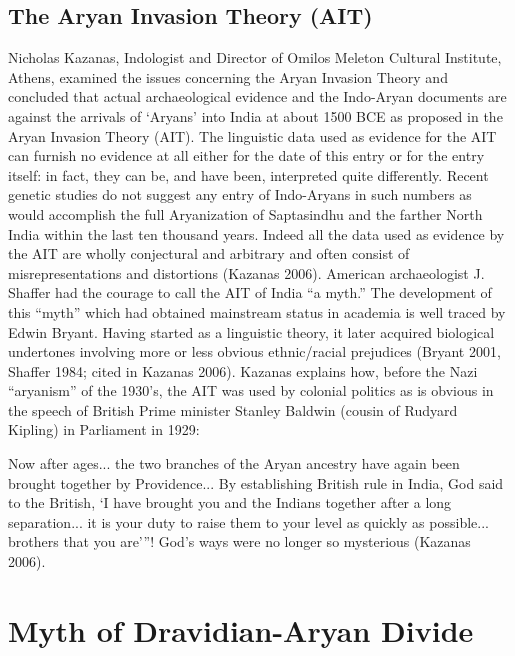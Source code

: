 \subsection*{The Aryan Invasion Theory (AIT)}

Nicholas Kazanas, Indologist and Director of Omilos Meleton Cultural Institute, Athens, examined the issues concerning the Aryan Invasion Theory and concluded that actual archaeological evidence and the Indo-Aryan documents are against the arrivals of ‘Aryans’ into India at about 1500 BCE as proposed in the Aryan Invasion Theory (AIT). The linguistic data used as evidence for the AIT can furnish no evidence at all either for the date of this entry or for the entry itself: in fact, they can be, and have been, interpreted quite differently. Recent genetic studies do not suggest any entry of Indo-Aryans in such numbers as would accomplish the full Aryanization of Saptasindhu and the farther North India within the last ten thousand years. Indeed all the data used as evidence by the AIT are wholly conjectural and arbitrary and often consist of misrepresentations and distortions (Kazanas 2006). American archaeologist J. Shaffer had the courage to call the AIT of India “a myth.” The development of this “myth” which had obtained mainstream status in academia is well traced by Edwin Bryant. Having started as a linguistic theory, it later acquired biological undertones involving more or less obvious ethnic/racial prejudices (Bryant 2001, Shaffer 1984; cited in Kazanas 2006). Kazanas explains how, before the Nazi “aryanism” of the 1930’s, the AIT was used by colonial politics as is obvious in the speech of British Prime minister Stanley Baldwin (cousin of Rudyard Kipling) in Parliament in 1929:

\begin{myquote}
Now after ages... the two branches of the Aryan ancestry have again been brought together by Providence... By establishing British rule in India, God said to the British, ‘I have brought you and the Indians together after a long separation... it is your duty to raise them to your level as quickly as possible... brothers that you are’”! God’s ways were no longer so mysterious (Kazanas 2006). 
\end{myquote}



\section*{Myth of Dravidian-Aryan Divide}

